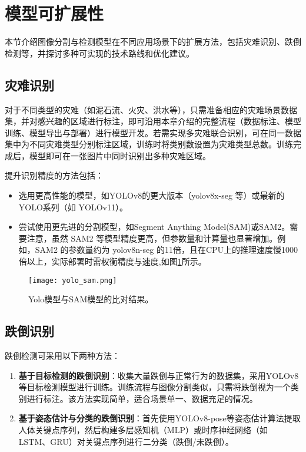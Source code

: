 \section{模型可扩展性}

本节介绍图像分割与检测模型在不同应用场景下的扩展方法，包括灾难识别、跌倒检测等，并探讨多种可实现的技术路线和优化建议。

\subsection{灾难识别}

对于不同类型的灾难（如泥石流、火灾、洪水等），只需准备相应的灾难场景数据集，并对感兴趣的区域进行标注，即可沿用本章介绍的完整流程（数据标注、模型训练、模型导出与部署）进行模型开发。若需实现多灾难联合识别，可在同一数据集中为不同灾难类型分别标注区域，训练时将类别数设置为灾难类型总数。训练完成后，模型即可在一张图片中同时识别出多种灾难区域。

提升识别精度的方法包括：
\begin{itemize}
    \item 选用更高性能的模型，如YOLOv8的更大版本（yolov8x-seg 等）或最新的YOLO系列（如 YOLOv11）。
    \item 尝试使用更先进的分割模型，如Segment Anything Model(SAM)或SAM2。需要注意，虽然 SAM2 等模型精度更高，但参数量和计算量也显著增加。例如，SAM2 的参数量约为 yolov8n-seg 的11倍，且在CPU上的推理速度慢1000倍以上，实际部署时需权衡精度与速度,如图\ref{fig:yolo_sam}所示。
\end{itemize}
\begin{figure}[H]  %
    \centering  %
    \texttt{[image: yolo\_sam.png]}  %
    \caption{Yolo模型与SAM模型的比对结果。}  %
    \label{fig:yolo_sam}
\end{figure}

\subsection{跌倒识别}

跌倒检测可采用以下两种方法：

\begin{enumerate}
    \item \textbf{基于目标检测的跌倒识别}：收集大量跌倒与正常行为的数据集，采用YOLOv8等目标检测模型进行训练。训练流程与图像分割类似，只需将跌倒视为一个类别进行标注。该方法实现简单，适合场景单一、数据充足的情况。
    \item \textbf{基于姿态估计与分类的跌倒识别}：首先使用YOLOv8-pose等姿态估计算法提取人体关键点序列，然后构建多层感知机（MLP）或时序神经网络（如 LSTM、GRU）对关键点序列进行二分类（跌倒/未跌倒）。
\end{enumerate}

